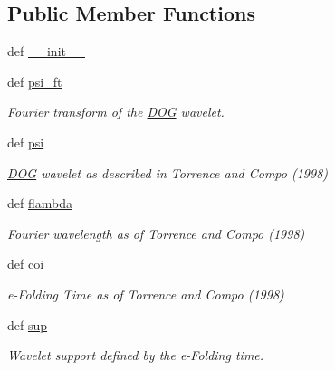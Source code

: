\subsection*{Public Member Functions}
\begin{DoxyCompactItemize}
\item 
def \hyperlink{classprojects_1_1piwavelet_1_1piwavelet_1_1piwavelet_1_1DOG_a3558a19631d7d1fe59a9cfa7840276af}{\-\_\-\-\_\-init\-\_\-\-\_\-}
\item 
def \hyperlink{classprojects_1_1piwavelet_1_1piwavelet_1_1piwavelet_1_1DOG_aae699e5b447aeac76f4e47142a5aaa9e}{psi\-\_\-ft}
\begin{DoxyCompactList}\small\item\em Fourier transform of the \hyperlink{classprojects_1_1piwavelet_1_1piwavelet_1_1piwavelet_1_1DOG}{D\-O\-G} wavelet. \end{DoxyCompactList}\item 
def \hyperlink{classprojects_1_1piwavelet_1_1piwavelet_1_1piwavelet_1_1DOG_a56d2b11424e3eb7db03f6a500bb7bc55}{psi}
\begin{DoxyCompactList}\small\item\em \hyperlink{classprojects_1_1piwavelet_1_1piwavelet_1_1piwavelet_1_1DOG}{D\-O\-G} wavelet as described in Torrence and Compo (1998) \end{DoxyCompactList}\item 
def \hyperlink{classprojects_1_1piwavelet_1_1piwavelet_1_1piwavelet_1_1DOG_a58fb0edba273c4a5b016f99f3e45e918}{flambda}
\begin{DoxyCompactList}\small\item\em Fourier wavelength as of Torrence and Compo (1998) \end{DoxyCompactList}\item 
def \hyperlink{classprojects_1_1piwavelet_1_1piwavelet_1_1piwavelet_1_1DOG_ae5d0da5a8faf4d4d648f6402b4c516a8}{coi}
\begin{DoxyCompactList}\small\item\em e-\/\-Folding Time as of Torrence and Compo (1998) \end{DoxyCompactList}\item 
def \hyperlink{classprojects_1_1piwavelet_1_1piwavelet_1_1piwavelet_1_1DOG_a5e6fd317b32529423060f86e99e068ee}{sup}
\begin{DoxyCompactList}\small\item\em Wavelet support defined by the e-\/\-Folding time. \end{DoxyCompactList}\end{DoxyCompactItemize}
